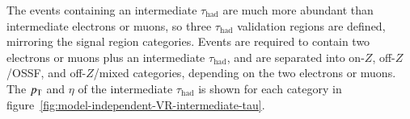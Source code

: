 %

The events containing an intermediate $\tau_{\mathrm{had}}$ are much more abundant than intermediate electrons or muons, so three $\tau_{\mathrm{had}}$ validation regions are defined, mirroring the signal region categories. Events are required to contain two electrons or muons plus an intermediate $\tau_{\mathrm{had}}$, and are separated into on-$Z$, off-$Z$/OSSF, and off-$Z$/mixed categories, depending on the two electrons or muons. The $p_{\text{T}}$ and $\eta$ of the intermediate $\tau_{\mathrm{had}}$ is shown for each category in figure~\ref{fig:model-independent-VR-intermediate-tau}.

